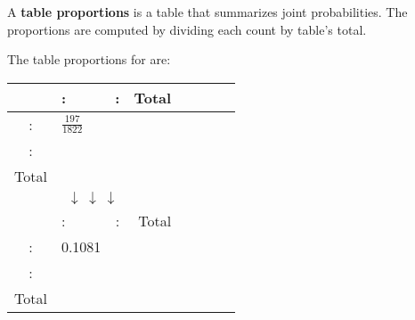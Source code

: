 \documentclass{beamer}
\begin{document}
\begin{frame}
\begin{definition}
A \textbf{table proportions} is a table that summarizes joint probabilities. The proportions are computed by dividing each count by table's total.
\end{definition}\pause

\begin{example}\label{table props}
\vspace{-2mm}%
The table proportions for  are:

\vspace{-5mm}
\begin{center}
\begin{tabular}{Sl Sr Sr Sr}\hline
& :  & :  & Total \\\hline
{}:  & $\tfrac{197}{1822}$  &  &  \\[1mm]
:  &  &  &  \\\hline
Total &  &  &  \\\hline
{}\\\hline
& :  & :  & Total \\\hline
{}:  & 0.1081  &  &  \\
:  &  &  &  \\\hline
Total &  &  &  \\\hline
\end{tabular}
\end{center}
\end{example}
\end{frame}
\end{document}
